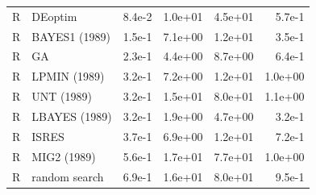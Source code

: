 \begin{tabular}{llrrrr}
R & DEoptim & 8.4e-2 & 1.0e+01 & 4.5e+01 & 5.7e-1 \\
R & BAYES1 (1989) & 1.5e-1 & 7.1e+00 & 1.2e+01 & 3.5e-1 \\
R & GA & 2.3e-1 & 4.4e+00 & 8.7e+00 & 6.4e-1 \\
R & LPMIN (1989) & 3.2e-1 & 7.2e+00 & 1.2e+01 & 1.0e+00 \\
R & UNT (1989) & 3.2e-1 & 1.5e+01 & 8.0e+01 & 1.1e+00 \\
R & LBAYES (1989) & 3.2e-1 & 1.9e+00 & 4.7e+00 & 3.2e-1 \\
R & ISRES & 3.7e-1 & 6.9e+00 & 1.2e+01 & 7.2e-1 \\
R & MIG2 (1989) & 5.6e-1 & 1.7e+01 & 7.7e+01 & 1.0e+00 \\
R & random search & 6.9e-1 & 1.6e+01 & 8.0e+01 & 9.5e-1 \\
\bottomrule
\end{tabular}